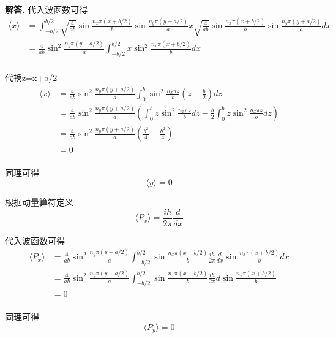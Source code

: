 \documentclass[12pt, a4paper, oneside]{ctexart}
\newenvironment{solution}{\par\noindent\textbf{解答. }}{\\\par}
\begin{document}
\begin{solution}
    代入波函数可得
    \begin{align}
        \langle x \rangle &= \int _{-b/2}^{b/2} \sqrt{\frac{4}{ab}}\sin\frac{n_x\pi (x+b/2)}{b}\sin\frac{n_y\pi (y+a/2)}{a} x \sqrt{\frac{4}{ab}}\sin\frac{n_x\pi (x+b/2)}{b}\sin\frac{n_y\pi (y+a/2)}{a} dx \\
        &= \frac{4}{ab}\sin^2\frac{n_y\pi (y+a/2)}{a} \int _{-b/2}^{b/2} x \sin^2\frac{n_x\pi (x+b/2)}{b} dx\\
    \end{align}

    代换z=x+b/2
    \begin{align}
        \langle x \rangle &= \frac{4}{ab}\sin^2\frac{n_y\pi (y+a/2)}{a} \int_0^b \sin^2\frac{n_x\pi z}{b}(z-\frac b 2) dz\\
        &= \frac{4}{ab}\sin^2\frac{n_y\pi (y+a/2)}{a} \left ( \int_0^b z\sin^2\frac{n_x\pi z}{b} dz- \frac b 2 \int_0^b z\sin^2\frac{n_x\pi z}{b} dz \right )\\
        &=  \frac{4}{ab}\sin^2\frac{n_y\pi (y+a/2)}{a} \left (\frac {b^2}{4}- \frac {b^2}{4}  \right )\\
        &= 0 \\
    \end{align}

    同理可得
    \begin{equation}
        \langle y \rangle = 0
    \end{equation}

    根据动量算符定义
    \begin{equation}
        \langle P_x \rangle = \frac{ih}{2\pi} \frac{d}{dx}
    \end{equation}
    
    代入波函数可得
    \begin{align}
        \langle P_x \rangle &= \frac{4}{ab}\sin^2\frac{n_y \pi (y+a/2)}{a} \int _{-b/2}^{b/2} \sin \frac{n_x \pi(x+b/2)}{b} \frac{ih}{2\pi} \frac{d}{dx} \sin \frac{n_x \pi(x+b/2)}{b} dx \\
        &=  \frac{4}{ab}\sin^2\frac{n_y \pi (y+a/2)}{a} \int _{-b/2}^{b/2} \sin \frac{n_x \pi(x+b/2)}{b} \frac{ih}{2\pi} d \sin \frac{n_x \pi(x+b/2)}{b}\\
        &= 0 \\
    \end{align}

    同理可得
    \begin{equation}
        \langle P_y \rangle = 0
    \end{equation}

\end{solution}
\end{document}
